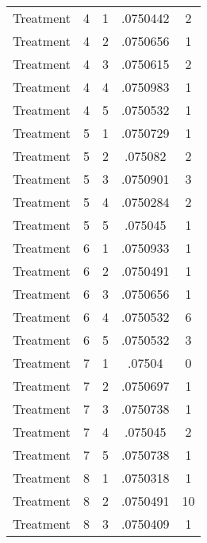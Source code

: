 \begin{tabular}{l*{4}{c}}
Treatment           &           4&           1&    .0750442&           2\\
Treatment           &           4&           2&    .0750656&           1\\
Treatment           &           4&           3&    .0750615&           2\\
Treatment           &           4&           4&    .0750983&           1\\
Treatment           &           4&           5&    .0750532&           1\\
Treatment           &           5&           1&    .0750729&           1\\
Treatment           &           5&           2&     .075082&           2\\
Treatment           &           5&           3&    .0750901&           3\\
Treatment           &           5&           4&    .0750284&           2\\
Treatment           &           5&           5&     .075045&           1\\
Treatment           &           6&           1&    .0750933&           1\\
Treatment           &           6&           2&    .0750491&           1\\
Treatment           &           6&           3&    .0750656&           1\\
Treatment           &           6&           4&    .0750532&           6\\
Treatment           &           6&           5&    .0750532&           3\\
Treatment           &           7&           1&      .07504&           0\\
Treatment           &           7&           2&    .0750697&           1\\
Treatment           &           7&           3&    .0750738&           1\\
Treatment           &           7&           4&     .075045&           2\\
Treatment           &           7&           5&    .0750738&           1\\
Treatment           &           8&           1&    .0750318&           1\\
Treatment           &           8&           2&    .0750491&          10\\
Treatment           &           8&           3&    .0750409&           1\\

\end{tabular}

